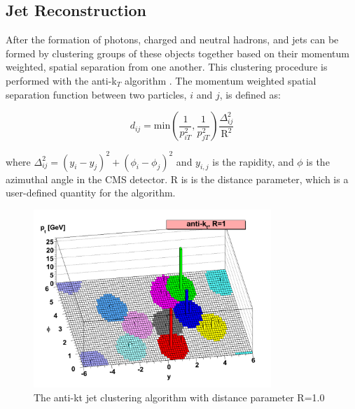 \subsection{Jet Reconstruction}
\label{jet_reco_overview}

\par After the formation of photons, charged and neutral hadrons, and jets
can be formed by clustering groups of these objects together based on
their momentum weighted, spatial separation from one another.  This
clustering procedure is performed with the anti-k$_{T}$ algorithm
\cite{Cacciari:2008gp}.   The momentum weighted spatial separation
function between two particles, $i$ and $j$, is defined as:

\begin{equation}\label{eq:antiKt_d}
d_{ij} = \text{min}(\frac{1}{p_{iT}^{2}},
\frac{1}{p_{jT}^{2}})\frac{\Delta_{ij}^{2}}{\text{R}^{2}}
\end{equation}

\noindent where $\Delta_{ij}^{2} =
(y_{i}-y_{j})^{2}+(\phi_{i}-\phi_{j})^{2}$ and $y_{i,j}$ is the
rapidity, and $\phi$ is the azimuthal angle in the CMS detector.  R is
is the distance parameter, which is a user-defined quantity for the
algorithm.  

\begin{figure}[h]
   \centering
  \includegraphics[width=0.8\textwidth]{Figures/Reconstruction_Diagrams/Jets__AntiKt_Algo.pdf}
  \caption{The anti-kt jet clustering algorithm with distance
    parameter R=1.0 \cite{Cacciari:2008gp}} \label{fig:antiKt}
\end{figure}

